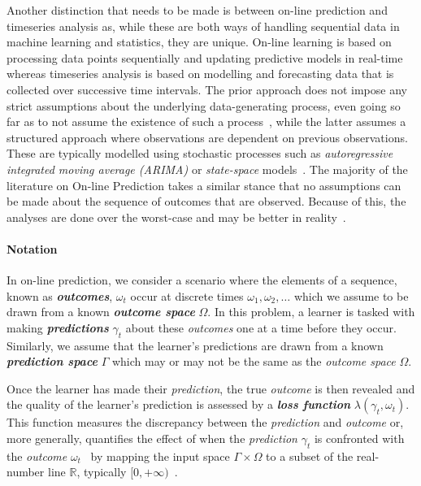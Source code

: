 Another distinction that needs to be made is between on-line prediction and timeseries analysis as, while these are both ways of handling sequential data in machine learning and statistics, they are unique. On-line learning is based on processing data points sequentially and updating predictive models in real-time whereas timeseries analysis is based on modelling and forecasting data that is collected over successive time intervals. The prior approach does not impose any strict assumptions about the underlying data-generating process, even going so far as to not assume the existence of such a process~\cite{vovk:2001}, while the latter assumes a structured approach where observations are dependent on previous observations. These are typically modelled using stochastic processes such as \textit{autoregressive integrated moving average (ARIMA)} or \textit{state-space} models~\cite{box:2015}. The majority of the literature on On-line Prediction takes a similar stance that no assumptions can be made about the sequence of outcomes that are observed. Because of this, the analyses are done over the worst-case and may be better in reality~\cite{cesa-bianchi:1997}.

\paragraph*{Notation}
In on-line prediction, we consider a scenario where the elements of a sequence, known as \textit{\textbf{outcomes}}, $\omega_t$ occur at discrete times $\omega_1, \omega_2, \ldots$ which we assume to be drawn from a known \textit{\textbf{outcome space}} $\Omega$. In this problem, a learner is tasked with making \textit{\textbf{predictions}} $\gamma_t$ about these \textit{outcomes} one at a time before they occur. Similarly, we assume that the learner's predictions are drawn from a known \textit{\textbf{prediction space}} $\Gamma$ which may or may not be the same as the \textit{outcome space} $\Omega$. 

Once the learner has made their \textit{prediction}, the true \textit{outcome} is then revealed and the quality of the learner's prediction is assessed by a \textit{\textbf{loss function}} $\lambda(\gamma_t, \omega_t)$. This function measures the discrepancy between the \textit{prediction} and \textit{outcome} or, more generally, quantifies the effect of when the \textit{prediction} $\gamma_t$ is confronted with the \textit{outcome} $\omega_t$~\cite{adamskiy:2019} by mapping the input space $\Gamma \times \Omega$ to a subset of the real-number line $\mathbb{R}$, typically $[0, +\infty)$~\cite{kalnishkan:2009}.

